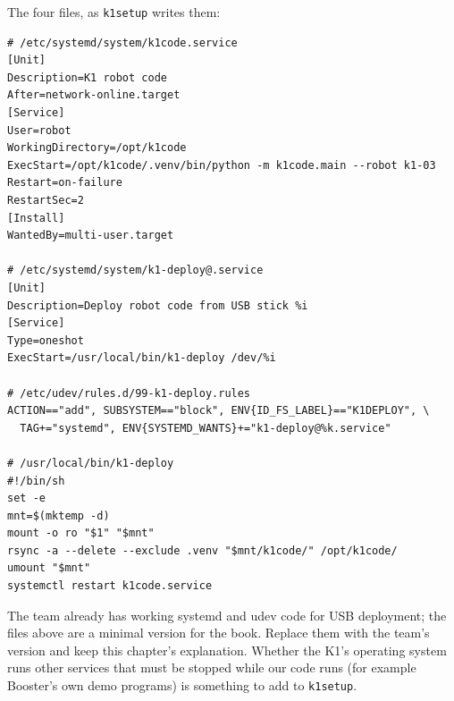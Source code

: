 The four files, as \texttt{k1setup} writes them:
\begin{verbatim}
# /etc/systemd/system/k1code.service
[Unit]
Description=K1 robot code
After=network-online.target
[Service]
User=robot
WorkingDirectory=/opt/k1code
ExecStart=/opt/k1code/.venv/bin/python -m k1code.main --robot k1-03
Restart=on-failure
RestartSec=2
[Install]
WantedBy=multi-user.target

# /etc/systemd/system/k1-deploy@.service
[Unit]
Description=Deploy robot code from USB stick %i
[Service]
Type=oneshot
ExecStart=/usr/local/bin/k1-deploy /dev/%i

# /etc/udev/rules.d/99-k1-deploy.rules
ACTION=="add", SUBSYSTEM=="block", ENV{ID_FS_LABEL}=="K1DEPLOY", \
  TAG+="systemd", ENV{SYSTEMD_WANTS}+="k1-deploy@%k.service"

# /usr/local/bin/k1-deploy
#!/bin/sh
set -e
mnt=$(mktemp -d)
mount -o ro "$1" "$mnt"
rsync -a --delete --exclude .venv "$mnt/k1code/" /opt/k1code/
umount "$mnt"
systemctl restart k1code.service
\end{verbatim}
\begin{guessbox}
The team already has working systemd and udev code for USB deployment; the files above are a minimal version for the book. Replace them with the team's version and keep this chapter's explanation. Whether the K1's operating system runs other services that must be stopped while our code runs (for example Booster's own demo programs)\guess{} is something to add to \texttt{k1setup}.
\end{guessbox}

